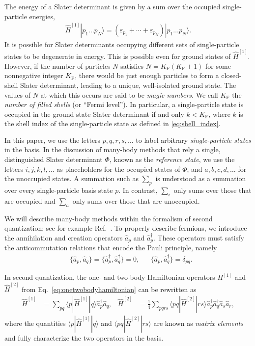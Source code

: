 The energy of a Slater determinant is given by a sum over the occupied single-particle energies,
\begin{align*}
  \hat{H}^{[1]} | p_1 \ldots p_N \rangle = (\varepsilon_{p_1} + \cdots + \varepsilon_{p_N}) | p_1 \ldots p_N \rangle.
\end{align*}
It is possible for Slater determinants occupying different sets of
single-particle states to be degenerate in energy.  This is possible
even for ground states of $\hat{H}^{[1]}$.  However, if the number of
particles $N$ satisfies $N = K_{\mathrm{F}} (K_{\mathrm{F}} + 1)$ for
some nonnegative integer $K_{\mathrm{F}}$, there would be just enough
particles to form a closed-shell Slater determinant, leading to a
unique, well-isolated ground state.  The values of $N$ at which this
occurs are said to be \textit{magic numbers}.  We call
$K_{\mathrm{F}}$ the \textit{number of filled shells} (or ``Fermi
level'').  In particular, a single-particle state is occupied in the
ground state Slater determinant if and only $k < K_{\mathrm{F}}$,
where $k$ is the shell index of the single-particle state as defined
in \eqref{eq:shell_index}.

In this paper, we use the letters $p, q, r, s, \ldots$ to label
arbitrary \textit{single-particle states} in the basis.  In the
discussion of many-body methods that rely a single, distinguished
Slater determinant $\Phi$, known as the \textit{reference state}, we
use the letters $i, j, k, l, \ldots$ as placeholders for the occupied
states of $\Phi$, and $a, b, c, d, \ldots$ for the unoccupied states.
A summation such as $\sum_p$ is understood as a summation over every
single-particle basis state $p$.  In contrast, $\sum_i$ only sums over
those that are occupied and $\sum_a$ only sums over those that are
unoccupied.

We will describe many-body methods within the formalism of second
quantization; see for example Ref.\ \cite{shavitt2009many}.  To
properly describe fermions, we introduce the annihilation and creation
operators $\hat a_p$ and $\hat a_p^\dagger$. These operators must
satisfy the anticommutation relations that encode the Pauli principle,
namely
\begin{align*}
  &\{\hat a_p, \hat a_q\} = \{\hat a_p^\dagger, \hat a_q^\dagger\} = 0, &
  &\{\hat a_p, \hat a_q^\dagger\} = \delta_{p q}.
\end{align*}

In second quantization, the one- and two-body Hamiltonian operators $H^{[1]}$ and $\hat{H}^{[2]}$ from Eq.\ \eqref{eq:onetwobodyhamiltonian} can be rewritten as
\begin{align} \label{eq:second_quantized_hamiltonian}
  \hat H^{[1]} &= \sum_{p q} \langle p | \hat{H}^{[1]} | q \rangle \hat a_p^\dagger \hat a_q^{}, &
  \hat{H}^{[2]} &= \frac{1}{4} \sum_{p q r s} \langle p q | \hat{H}^{[2]} | r s \rangle \hat a_p^\dagger \hat a_q^\dagger \hat a_s^{} \hat a_r^{},
\end{align}
where the quantities $\langle p | \hat{H}^{[1]} | q \rangle$ and $\langle p q | \hat{H}^{[2]} | r s \rangle$ are known as \textit{matrix elements} and fully characterize the two operators in the basis.

